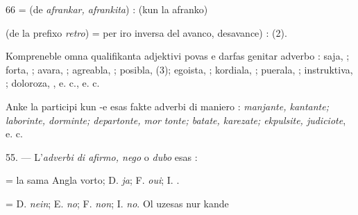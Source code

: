 \begin{VUpage}[70]{66}
 = (de \textit{afrankar, afrankita}) : \nl
{} (kun la afranko) 

 (de la prefixo \textit{retro}) = per iro inversa del avanco,\nl
desavance) :  (2).

Kompreneble omna qualifikanta adjektivi povas e darfas\nl
genitar adverbo : saja, ; forta, ; avara, ;\nl
agreabla, ; posibla,  (3); egoista, ;\nl
kordiala, ; puerala, ; instruktiva, \cc
{}; doloroza, , e. c., e. c.

Anke la participi kun -e esas fakte adverbi di maniero :\nl
\textit{manjante, kantante; laborinte, dorminte; departonte, mor}\cc
\textit{tonte; batate, karezate; ekpulsite, judiciote}, e. c.

\VUblanc{5.86pt}%
55. --- L'\textit{adverbi di afirmo, nego} o \textit{dubo} esas :

 = la sama Angla vorto; D. \textit{ja}; F. \textit{oui}; I. \textit{}.

 = D. \textit{nein}; E. \textit{no}; F. \textit{non}; I. \textit{no}. Ol uzesas nur kande\parplein
\end{VUpage}

